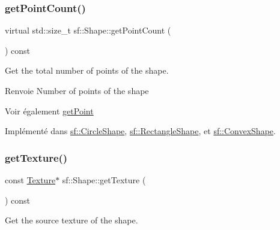 \mbox{\label{classsf_1_1Shape_af988dd61a29803fc04d02198e44b5643}} 
\subsubsection{\texorpdfstring{get\+Point\+Count()}{getPointCount()}}
{\footnotesize\ttfamily virtual std\+::size\+\_\+t sf\+::\+Shape\+::get\+Point\+Count (\begin{DoxyParamCaption}{ }\end{DoxyParamCaption}) const\hspace{0.3cm}{\ttfamily [pure virtual]}}



Get the total number of points of the shape. 

\begin{DoxyReturn}{Renvoie}
Number of points of the shape
\end{DoxyReturn}
\begin{DoxySeeAlso}{Voir également}
\hyperlink{classsf_1_1Shape_a40e5d83713eb9f0c999944cf96458085}{get\+Point} 
\end{DoxySeeAlso}


Implémenté dans \hyperlink{classsf_1_1CircleShape_a014d29ec11e8afa4dce50e7047d99601}{sf\+::\+Circle\+Shape}, \hyperlink{classsf_1_1RectangleShape_adfb2f429e5720c9ccdb26d5996c3ae33}{sf\+::\+Rectangle\+Shape}, et \hyperlink{classsf_1_1ConvexShape_a0c54b8d48fe4e13414f6e667dbfc22a3}{sf\+::\+Convex\+Shape}.

\mbox{\label{classsf_1_1Shape_a06682d37fd38d8fad56afdd5228b6951}} 
\subsubsection{\texorpdfstring{get\+Texture()}{getTexture()}}
{\footnotesize\ttfamily const \hyperlink{classsf_1_1Texture}{Texture}$\ast$ sf\+::\+Shape\+::get\+Texture (\begin{DoxyParamCaption}{ }\end{DoxyParamCaption}) const}



Get the source texture of the shape. 

